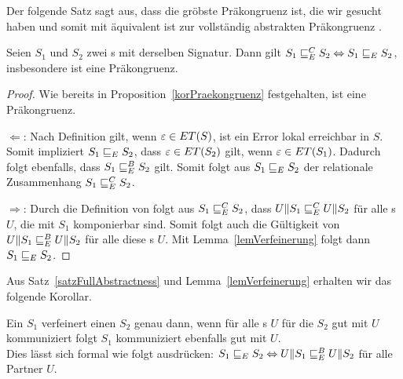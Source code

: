 Der folgende Satz sagt aus, dass \ERel{} die gröbste Präkongruenz ist, die wir
gesucht haben und somit mit äquivalent ist zur vollständig abstrakten
Präkongruenz \ECRel{}.

\begin{satz}
  \label{satzFullAbstractness}
  Seien $S_1$ und $S_2$ zwei \EIO{}s mit derselben Signatur. Dann gilt
  $S_1\sqsubseteq _E^C S_2\Leftrightarrow S_1\sqsubseteq _E S_2$, insbesondere ist \ERel{}
  eine Präkongruenz.
\end{satz}

\begin{proof}
  Wie bereits in Proposition~\ref{korPraekongruenz} festgehalten, ist \ERel{} eine
  Präkongruenz.

  \glqq $\Leftarrow$\grqq : Nach Definition gilt, wenn
      $\varepsilon\in ET{}(S)$, ist ein Error lokal erreichbar in $S$.
      Somit impliziert $S_1\sqsubseteq _E S_2$, dass $\varepsilon\in
      ET{}(S_2)$ gilt, wenn $\varepsilon\in ET{}(S_1)$. Dadurch folgt ebenfalls,
      dass $S_1\sqsubseteq _E^B S_2$ gilt. Somit folgt aus $S_1\sqsubseteq _E S_2$ der relationale
      Zusammenhang $S_1\sqsubseteq _E^C S_2$.

      \glqq $\Rightarrow$\grqq : Durch die Definition von \ECRel{} folgt aus
  $S_1\sqsubseteq _E^C S_2$, dass $U\|S_1\sqsubseteq _E^C U\|S_2$ für alle \EIO{}s $U$, die mit
  $S_1$ komponierbar sind. Somit folgt auch die Gültigkeit von
  $U\|S_1\sqsubseteq _E^B U\|S_2$ für alle diese \EIO{}s $U$. Mit
  Lemma~\ref{lemVerfeinerung} folgt dann $S_1\sqsubseteq _E S_2$.
\end{proof}

Aus Satz~\ref{satzFullAbstractness} und Lemma~\ref{lemVerfeinerung} erhalten
wir das folgende Korollar.

\begin{kor}
  Ein \EIO{} $S_1$ verfeinert einen \EIO{} $S_2$ genau dann, wenn für alle \EIO{}s $U$
  für die $S_2$ gut mit $U$ kommuniziert folgt $S_1$ kommuniziert
  ebenfalls gut mit $U$.\\
  Dies lässt sich formal wie folgt ausdrücken: $S_1\sqsubseteq _E S_2
  \Leftrightarrow U\|S_1\sqsubseteq _E^B U\|S_2$ für alle Partner $U$.
\end{kor}

